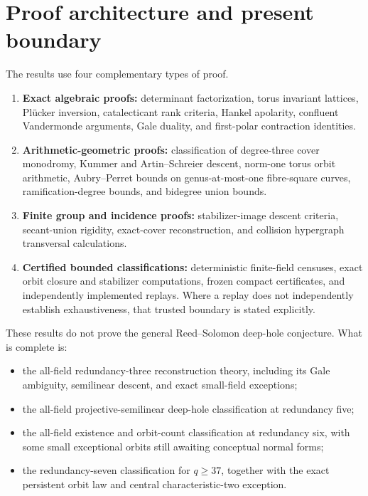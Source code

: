 \documentclass[11pt]{article}
\begin{document}
\section{Proof architecture and present boundary}

The results use four complementary types of proof.
\begin{enumerate}
\item \textbf{Exact algebraic proofs:} determinant factorization, torus
invariant lattices, Pl\"ucker inversion, catalecticant rank criteria,
Hankel apolarity, confluent Vandermonde arguments, Gale duality, and
first-polar contraction identities.

\item \textbf{Arithmetic-geometric proofs:} classification of degree-three
cover monodromy, Kummer and Artin--Schreier descent, norm-one torus orbit
arithmetic, Aubry--Perret bounds on genus-at-most-one fibre-square curves,
ramification-degree bounds, and bidegree union bounds.

\item \textbf{Finite group and incidence proofs:} stabilizer-image descent
criteria, secant-union rigidity, exact-cover reconstruction, and collision
hypergraph transversal calculations.

\item \textbf{Certified bounded classifications:} deterministic finite-field
censuses, exact orbit closure and stabilizer computations, frozen compact
certificates, and independently implemented replays.  Where a replay does
not independently establish exhaustiveness, that trusted boundary is
stated explicitly.
\end{enumerate}

These results do not prove the general Reed--Solomon deep-hole conjecture.
What is complete is:
\begin{itemize}
\item the all-field redundancy-three reconstruction theory, including its
Gale ambiguity, semilinear descent, and exact small-field exceptions;
\item the all-field projective-semilinear deep-hole classification at
redundancy five;
\item the all-field existence and orbit-count classification at redundancy
six, with some small exceptional orbits still awaiting conceptual normal
forms;
\item the redundancy-seven classification for $q\geq37$, together with
the exact persistent orbit law and central characteristic-two exception.
\end{itemize}
\end{document}
